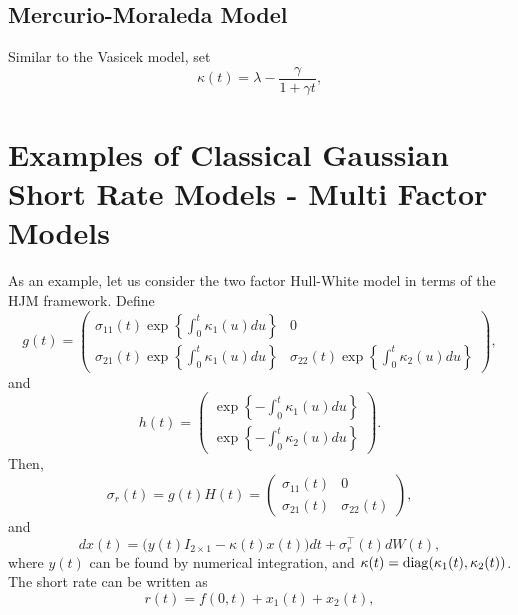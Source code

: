 \documentclass[12pt]{article}
\begin{document}
  \subsection{Mercurio-Moraleda Model}

  Similar to the Vasicek model, set
  \begin{equation}
    \kappa(t)=\lambda-\frac{\gamma}{1+\gamma t},
  \end{equation}



\section{Examples of Classical Gaussian Short Rate Models - Multi Factor Models}

  As an example, let us consider the two factor Hull-White model in terms of the HJM framework. Define
  \begin{equation}
    g(t)=\left(
            \begin{array}{cc}
              \sigma_{11}(t)\exp\left\{\int_0^t\kappa_1(u)du\right\} & 0 \\
              \sigma_{21}(t)\exp\left\{\int_0^t\kappa_1(u)du\right\} & \sigma_{22}(t)\exp\left\{\int_0^t\kappa_2(u)du\right\}
            \end{array}
         \right),
  \end{equation}
  and
  \begin{equation}
    h(t)=\left(
            \begin{array}{c}
              \exp\left\{-\int_0^t\kappa_1(u)du\right\}\\
              \exp\left\{-\int_0^t\kappa_2(u)du\right\}
            \end{array}
         \right).
  \end{equation}
  Then,
  \begin{equation}
    \sigma_r(t)=g(t)H(t)=\left(
            \begin{array}{cc}
              \sigma_{11}(t) & 0 \\
              \sigma_{21}(t) & \sigma_{22}(t)
            \end{array}
         \right),
  \end{equation}
  and
  \begin{equation}
    dx(t)=\Big(y(t)I_{2\times 1}-\kappa(t)x(t)\Big)dt+\sigma_r^{{\top}}(t)dW(t),
  \end{equation}
  where $y(t)$ can be found by numerical integration, and $\kappa(t)={\rm diag}(\kappa_1(t),\kappa_2(t))$. The short rate can be
  written as
  \begin{equation}
    r(t)=f(0,t)+x_1(t)+x_2(t),
  \end{equation}
\end{document}
